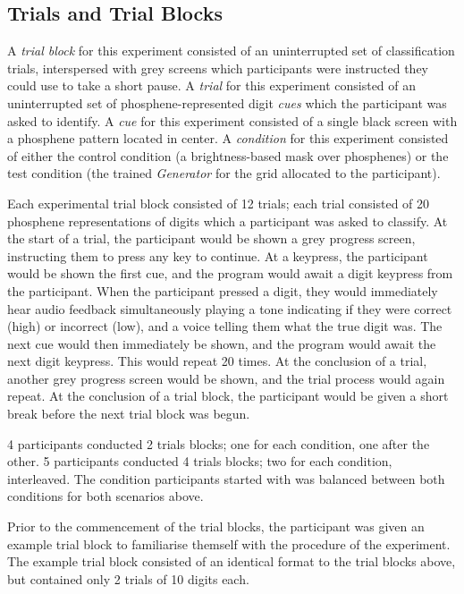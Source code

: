 \documentclass[a4paper,11pt,openany]{book}
\begin{document}
\subsection*{Trials and Trial Blocks}
\label{sec:orge1827ea}

A \emph{trial block} for this experiment consisted of an uninterrupted set of classification trials, interspersed with grey screens which participants were instructed they could use to take a short pause.
A \emph{trial} for this experiment consisted of an uninterrupted set of phosphene-represented digit \emph{cues} which the participant was asked to identify.
A \emph{cue} for this experiment consisted of a single black screen with a phosphene pattern located in center.
A \emph{condition} for this experiment consisted of either the control condition (a brightness-based mask over phosphenes) or the test condition (the trained \emph{Generator} for the grid allocated to the participant).

Each experimental trial block consisted of 12 trials; each trial consisted of 20 phosphene representations of digits which a participant was asked to classify.
At the start of a trial, the participant would be shown a grey progress screen, instructing them to press any key to continue.
At a keypress, the participant would be shown the first cue, and the program would await a digit keypress from the participant.
When the participant pressed a digit, they would immediately hear audio feedback simultaneously playing a tone indicating if they were correct (high) or incorrect (low), and a voice telling them what the true digit was.
The next cue would then immediately be shown, and the program would await the next digit keypress.
This would repeat 20 times.
At the conclusion of a trial, another grey progress screen would be shown, and the trial process would again repeat.
At the conclusion of a trial block, the participant would be given a short break before the next trial block was begun.

4 participants conducted 2 trials blocks; one for each condition, one after the other.
5 participants conducted 4 trials blocks; two for each condition, interleaved.
The condition participants started with was balanced between both conditions for both scenarios above.

Prior to the commencement of the trial blocks, the participant was given an example trial block to familiarise themself with the procedure of the experiment.
The example trial block consisted of an identical format to the trial blocks above, but contained only 2 trials of 10 digits each.
\end{document}
